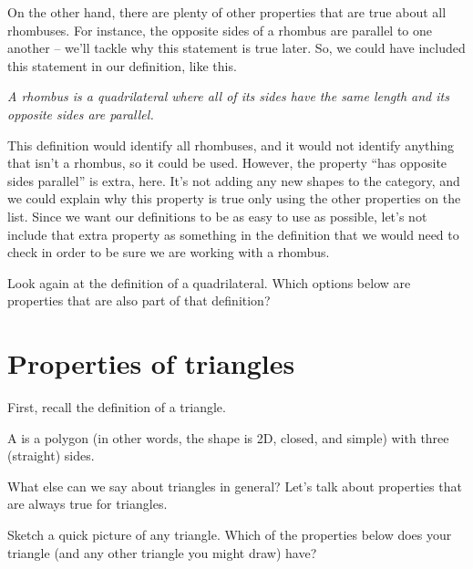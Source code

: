 \documentclass{ximera}
\begin{document}
On the other hand, there are plenty of other properties that are true about all rhombuses. For instance, the opposite sides of a rhombus are parallel to one another -- we'll tackle why this statement is true later. So, we could have included this statement in our definition, like this.
\begin{center}
	\emph{A rhombus is a quadrilateral where all of its sides have the same length and its opposite sides are parallel.}
\end{center}
This definition would identify all rhombuses, and it would not identify anything that isn't a rhombus, so it could be used. However, the property ``has opposite sides parallel'' is extra, here. It's not adding any new shapes to the category, and we could explain why this property is true only using the other properties on the list. Since we want our definitions to be as easy to use as possible, let's not include that extra property as something in the definition that we would need to check in order to be sure we are working with a rhombus.

\begin{question}
Look again at the definition of a quadrilateral. Which options below are properties that are also part of that definition?
\begin{selectAll}
\end{selectAll}
\end{question}

\section{Properties of triangles}

First, recall the definition of a triangle.
\begin{definition}
A  is a polygon (in other words, the shape is 2D, closed, and simple) with three (straight) sides.
\end{definition}

What else can we say about triangles in general? Let's talk about properties that are always true for triangles.

\begin{question}
Sketch a quick picture of any triangle. Which of the properties below does your triangle (and any other triangle you might draw) have?
\begin{selectAll}
\end{selectAll}
\end{question}
\end{document}
